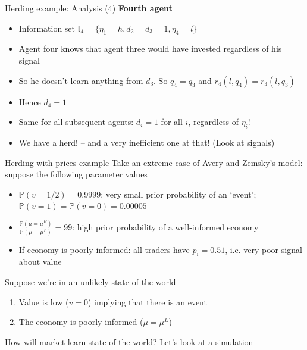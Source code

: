 \documentclass[english,10pt
,aspectratio=169
]{beamer}
\begin{document}
\begin{frame}{Herding example: Analysis (4)}
	\textbf{Fourth agent}
	\begin{itemize}
		\item Information set   $\mathbb{I}_4=\{\eta_1=h,d_2=d_3=1, \eta_4=l\}$
		\item Agent four knows that agent three would have invested regardless of his signal
		\item So he doesn't learn anything from $d_3$. So $q_4 = q_3$ and $r_4(l,q_4) = r_3(l,q_3)$
		\item Hence $d_4=1$
		\item Same for all subsequent agents: $d_i=1$ for all $i$, regardless of $\eta_i$!
		\item We have a herd! -- and a very inefficient one at that! (Look at signals) \hyperlink{HERD}{}
	\end{itemize}
\end{frame}



\begin{frame}{Herding with prices example} \label{layers}
	Take an extreme case of Avery and Zemsky's model: suppose the following parameter values
	\begin{itemize}
		\item $\mathbb{P}(v=1/2)=0.9999$: very small prior probability of an `event'; $\mathbb{P}(v=1)=\mathbb{P}(v=0)=0.00005$
		\item $\frac{\mathbb{P}(\mu=\mu^{H})}{\mathbb{P}(\mu=\mu^{L})}=99$: high prior probability of a well-informed economy
		\item If economy is poorly informed: all traders have $p_{i}=0.51$, i.e. very poor signal about value
	\end{itemize}
	Suppose we're in an unlikely state of the world
	\begin{enumerate}
		\item Value is low ($v=0$) implying that there is an event
		\item The economy is poorly informed ($\mu=\mu^L$)
	\end{enumerate}
	How will  market learn state of the world? Let's look at a  simulation
\end{frame}
\end{document}
